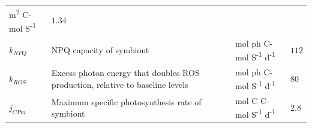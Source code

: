 \documentclass[]{elsarticle} %
\begin{document}
\begin{longtable}[]{@{}llll@{}}
\begin{minipage}[t]{0.24\columnwidth}
m\textsuperscript{2} C-mol S\textsuperscript{-1}\strut
\end{minipage} & \begin{minipage}[t]{0.09\columnwidth}\raggedright\strut
\(1.34\)\strut
\end{minipage}\tabularnewline
\begin{minipage}[t]{0.09\columnwidth}\raggedright\strut
\(k_{NPQ}\)\strut
\end{minipage} & \begin{minipage}[t]{0.46\columnwidth}\raggedright\strut
NPQ capacity of symbiont\strut
\end{minipage} & \begin{minipage}[t]{0.24\columnwidth}\raggedright\strut
mol ph C-mol S\textsuperscript{-1} d\textsuperscript{-1}\strut
\end{minipage} & \begin{minipage}[t]{0.09\columnwidth}\raggedright\strut
\(112\)\strut
\end{minipage}\tabularnewline
\begin{minipage}[t]{0.09\columnwidth}\raggedright\strut
\(k_{ROS}\)\strut
\end{minipage} & \begin{minipage}[t]{0.46\columnwidth}\raggedright\strut
Excess photon energy that doubles ROS production, relative to baseline
levels\strut
\end{minipage} & \begin{minipage}[t]{0.24\columnwidth}\raggedright\strut
mol ph C-mol S\textsuperscript{-1} d\textsuperscript{-1}\strut
\end{minipage} & \begin{minipage}[t]{0.09\columnwidth}\raggedright\strut
\(80\)\strut
\end{minipage}\tabularnewline
\begin{minipage}[t]{0.09\columnwidth}\raggedright\strut
\(j_{CPm}\)\strut
\end{minipage} & \begin{minipage}[t]{0.46\columnwidth}\raggedright\strut
Maximum specific photosynthesis rate of symbiont\strut
\end{minipage} & \begin{minipage}[t]{0.24\columnwidth}\raggedright\strut
mol C C-mol S\textsuperscript{-1} d\textsuperscript{-1}\strut
\end{minipage} & \begin{minipage}[t]{0.09\columnwidth}\raggedright\strut
\(2.8\)\strut
\end{minipage}\tabularnewline

\end{longtable}
\end{document}
